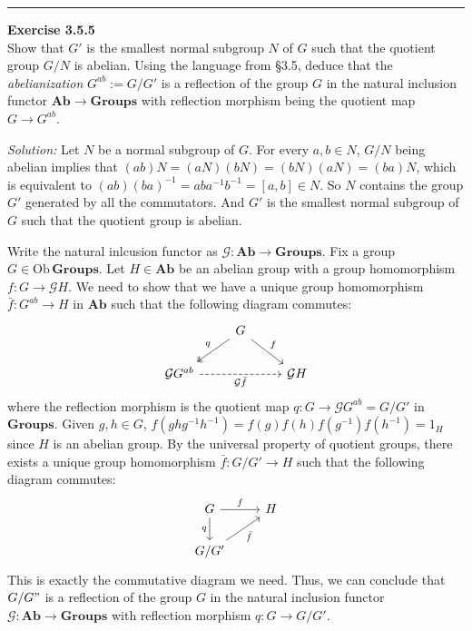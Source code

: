 \documentclass[a4paper, 12pt]{article}
\newenvironment{problem}[2][Exercise]
    { \begin{mdframed}[backgroundcolor=gray!20] \textbf{#1 #2} \\}
    {  \end{mdframed}}
\newenvironment{solution}
    {\textit{Solution:}}
    {}
\begin{document}
\noindent\rule{7in}{2.8pt}
\begin{problem}{3.5.5}
Show that \(G'\) is the smallest normal subgroup \(N\) of \(G\)	such that the quotient group \(G/N\) is abelian. Using the language from \S 3.5, deduce that the 
\textit{abelianization} \(G^{ab}:=G/G'\) is a reflection of the group \(G\) in the natural inclusion functor \(\mathbf{Ab}\rightarrow \mathbf{Groups}\) with reflection morphism being 
the quotient map \(G\rightarrow G^{ab}\).
\end{problem}
\begin{solution}
Let \(N\) be a normal subgroup of \(G\). For every \(a,b\in N\), \(G/N\) being abelian implies that \((ab)N=(aN)(bN)=(bN)(aN)=(ba)N\), which is equivalent to \((ab)(ba)^{-1}=aba^{-1}b^{-1}=[a,b]\in N\). So 
\(N\) contains the group \(G'\) generated by all the commutators. And \(G'\) is the smallest normal subgroup of\(G\) such that the quotient group is abelian. 
\par 
Write the natural inlcusion functor as \(\mathcal{G}:\mathbf{Ab}\rightarrow \mathbf{Groups}\). Fix a group \(G\in \text{Ob}\, \mathbf{Groups}\). Let \(H\in \mathbf{Ab}\) be an abelian group with a group 
homomorphism \(f:G\rightarrow \mathcal{G}H\). We need to show that we have a unique group homomorphism \(\bar{f}:G^{ab}\rightarrow H\) in \(\mathbf{Ab}\) such that the following diagram commutes:
$$\begin{tikzcd}
	& G \\
	{\mathcal{G}G^{ab}} && {\mathcal{G}H}
	\arrow["q"', two heads, from=1-2, to=2-1]
	\arrow["f", from=1-2, to=2-3]
	\arrow["{\mathcal{G}\bar{f}}"', dashed, from=2-1, to=2-3]
\end{tikzcd}$$
where the reflection morphism is the quotient map \(q:G\rightarrow \mathcal{G}G^{ab}=G/G'\) in \(\mathbf{Groups}\). 
Given \(g,h\in G\), \(f(ghg^{-1}h^{-1})=f(g)f(h)f(g^{-1})f(h^{-1})=1_H\) since \(H\) is an abelian group. By the universal property of quotient groups, there exists a unique group homomorphism 
\(\bar{f}:G/G'\rightarrow H\) such that the following diagram commutes:
$$\begin{tikzcd}
	G & H \\
	{G/G'}
	\arrow["f", from=1-1, to=1-2]
	\arrow["q"', from=1-1, to=2-1]
	\arrow["{\bar{f}}"', from=2-1, to=1-2]
\end{tikzcd}$$
This is exactly the commutative diagram we need. Thus, we can conclude that \(G/G"\) is a reflection of the group \(G\) in the natural inclusion functor \(\mathcal{G}:\mathbf{Ab}\rightarrow \mathbf{Groups}\) 
with reflection morphism \(q:G\rightarrow G/G'\).
\end{solution}
\end{document}

